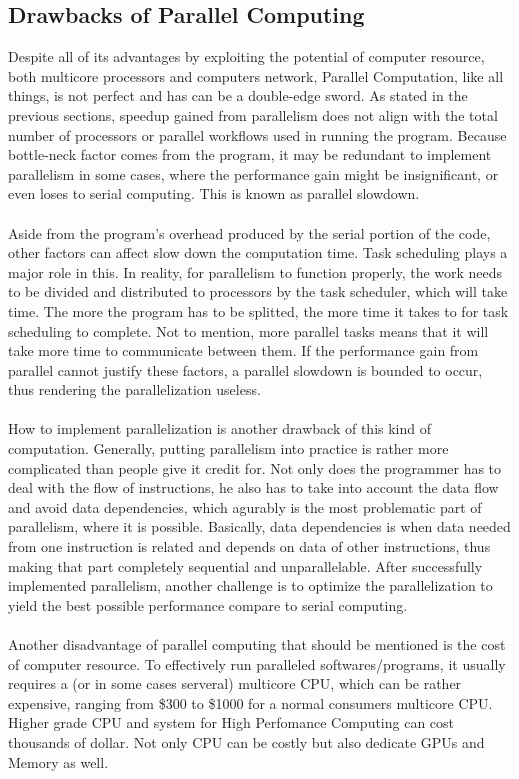 \subsection{Drawbacks of Parallel Computing}
Despite all of its advantages by exploiting the potential of computer resource, both multicore processors and computers network, Parallel Computation, like all things, is not perfect and has can be a double-edge sword. As stated in the previous sections, speedup gained from parallelism does not align with the total number of processors or parallel workflows used in running the program. Because bottle-neck factor comes from the program, it may be redundant to implement parallelism in some cases, where the performance gain might be insignificant, or even loses to serial computing. This is known as parallel slowdown. \\
~\\
Aside from the program's overhead produced by the serial portion of the code, other factors can affect slow down the computation time. Task scheduling plays a major role in this. In reality, for parallelism to function properly, the work needs to be divided and distributed to processors by the task scheduler, which will take time. The more the program has to be splitted, the more time it takes to for task scheduling to complete. Not to mention, more parallel tasks means that it will take more time to communicate between them. If the performance gain from parallel cannot justify these factors, a parallel slowdown is bounded to occur, thus rendering the parallelization useless. \\
~\\
How to implement parallelization is another drawback of this kind of computation. Generally, putting parallelism into practice is rather more complicated than people give it credit for. Not only does the programmer has to deal with the flow of instructions, he also has to take into account the data flow and avoid data dependencies, which agurably is the most problematic part of parallelism, where it is possible. Basically, data dependencies is when data needed from one instruction is related and depends on data of other instructions, thus making that part completely sequential and unparallelable. After successfully implemented parallelism, another challenge is to optimize the parallelization to yield the best possible performance compare to serial computing. \\
~\\
Another disadvantage of parallel computing that should be mentioned is the cost of computer resource. To effectively run paralleled softwares/programs, it usually requires a (or in some cases serveral) multicore CPU, which can be rather expensive, ranging from \$300 to \$1000 for a normal consumers multicore CPU. Higher grade CPU and system for High Perfomance Computing can cost thousands of dollar. Not only CPU can be costly but also dedicate GPUs and Memory as well. \\


